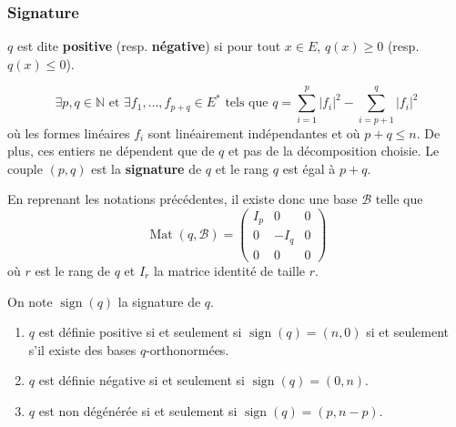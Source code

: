   \subsubsection{Signature}

  \begin{definition}
    $q$ est dite \textbf{positive} (resp. \textbf{négative}) si pour tout $x \in E$, $q(x) \geq 0$ (resp. $q(x) \leq 0$).
  \end{definition}


  \begin{theorem}
    \[ \exists p, q \in \mathbb{N} \text{ et } \exists f_1, \dots, f_{p+q} \in E^* \text{ tels que } q = \sum_{i=1}^p |f_i|^2 - \sum_{i=p+1}^q |f_i|^2 \]
    où les formes linéaires $f_i$ sont linéairement indépendantes et où $p + q \leq n$. De plus, ces entiers ne dépendent que de $q$ et pas de la décomposition choisie.
    \newpar
    Le couple $(p,q)$ est la \textbf{signature} de $q$ et le rang $q$ est égal à $p+q$.
  \end{theorem}

  \begin{remark}
    En reprenant les notations précédentes, il existe donc une base $\mathcal{B}$ telle que
    \[
    \operatorname{Mat}(q, \mathcal{B}) =
    \begin{pmatrix}
      I_p & 0 & 0 \\
      0 & -I_q & 0 \\
      0 & 0 & 0
    \end{pmatrix}
    \]
    où $r$ est le rang de $q$ et $I_r$ la matrice identité de taille $r$.
  \end{remark}


  \begin{corollary}
    On note $\operatorname{sign}(q)$ la signature de $q$.
    \begin{enumerate}[label=(\roman*)]
      \item $q$ est définie positive si et seulement si $\operatorname{sign}(q) = (n, 0)$ si et seulement s'il existe des bases $q$-orthonormées.
      \item $q$ est définie négative si et seulement si $\operatorname{sign}(q) = (0, n)$.
      \item $q$ est non dégénérée si et seulement si $\operatorname{sign}(q) = (p, n-p)$.
    \end{enumerate}
  \end{corollary}

